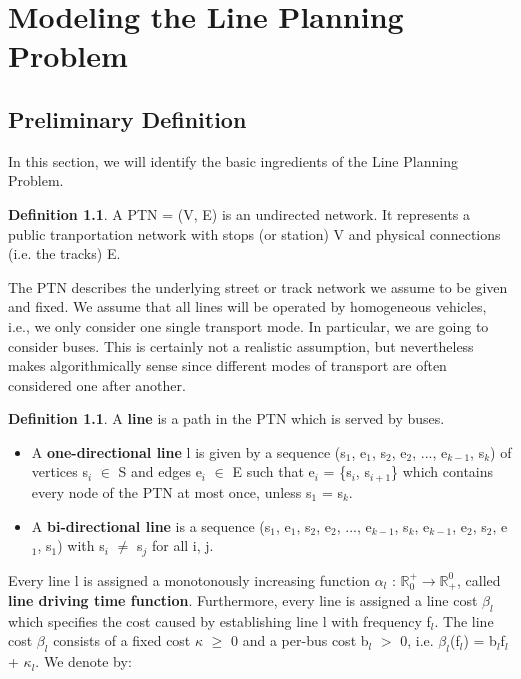 \documentclass[
  twoside,
  11pt, a4paper,
  footinclude=true,
  headinclude=true,
  cleardoublepage=empty
]{book}
\theoremstyle{definition}
\newtheorem{definition}[theorem]{Definition}
\begin{document}
\chapter{Modeling the Line Planning Problem}

\section{Preliminary Definition}
In this section, we will identify the basic ingredients of the Line Planning Problem.
\begin{definition}
A PTN = (V, E) is an undirected network. It represents a public tranportation network with stops (or station) V and physical connections (i.e. the tracks) E.
\end{definition}
The PTN describes the underlying street or track network we assume to be given and fixed. We assume that all lines will be operated by homogeneous vehicles, i.e., we only consider one single transport mode. In particular, we are going to consider buses. This is certainly not a realistic assumption, but nevertheless makes algorithmically sense since different modes of transport are often considered one after another.
\begin{definition}
A \textbf{line} is a path in the PTN which is served by buses. 
\begin{itemize}
\item A \textbf{one-directional line} l is given by a sequence (s$_1$, e$_1$, s$_2$, e$_2$, ..., e$_{k-1}$, s$_k$) of vertices s$_i$ $\in$ S and edges e$_i$ $\in$ E such that e$_i$ = \{s$_i$, s$_{i+1}$\} which contains every node of the PTN at most once, unless s$_1$ = s$_k$.
\item A \textbf{bi-directional line} is a sequence (s$_1$, e$_1$, s$_2$, e$_2$, ..., e$_{k-1}$, s$_k$, e$_{k-1}$, e$_2$, s$_2$, e$_1$, s$_1$) with s$_i$ $\ne$ s$_j$ for all i, j.
\end{itemize}
\end{definition}
Every line l is assigned a monotonously increasing function $\alpha_l$ : $\mathbb{R}^+_0 \rightarrow \mathbb{R}^0_+$, called \textbf{line driving time function}. \newline
Furthermore, every line is assigned a line cost $\beta_l$ which specifies the cost caused by establishing line l with frequency f$_l$. The line cost $\beta_l$ consists of a fixed cost $\kappa$ $\ge$ 0 and a per-bus cost b$_l$ $>$ 0, i.e. $\beta_l$(f$_l$) = b$_l$f$_l$ + $\kappa_l$. \newline
We denote by:
\end{document}
